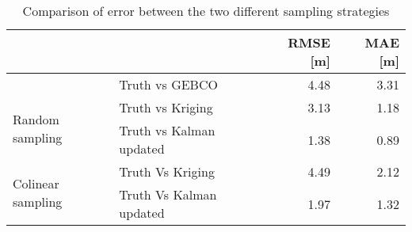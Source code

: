 \begin{table}[!ht]
\centering
\caption{Comparison of error between the two different sampling strategies}
\label{tab:random-vs-colinear-sampling}
\begin{tabular}{llrr}
\toprule
 &  & RMSE [m] & MAE [m] \\
\midrule
 & Truth vs GEBCO & 4.48 & 3.31 \\
\cline{1-2}
\multirow[c]{2}{*}{Random sampling} & Truth vs Kriging & 3.13 & 1.18 \\
 & Truth vs Kalman updated & 1.38 & 0.89 \\
\cline{1-2}
\multirow[c]{2}{*}{Colinear sampling} & Truth Vs Kriging & 4.49 & 2.12 \\
 & Truth Vs Kalman updated & 1.97 & 1.32 \\
\cline{1-2}
\bottomrule
\end{tabular}
\end{table}
